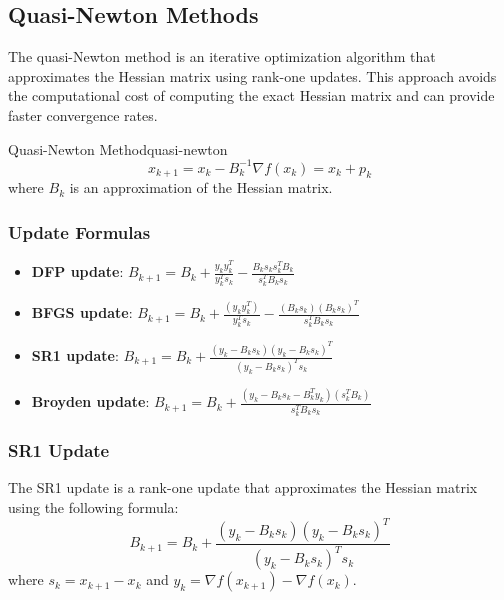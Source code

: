 \subsection*{Quasi-Newton Methods}
The quasi-Newton method is an iterative optimization algorithm that approximates the Hessian matrix using rank-one updates.
This approach avoids the computational cost of computing the exact Hessian matrix and can provide faster convergence rates.
\begin{definition}{Quasi-Newton Method}{quasi-newton}
	\[
		x_{k+1} = x_k - B_k^{-1} \nabla f(x_k) = x_k + p_k
	\]
	where \( B_k \) is an approximation of the Hessian matrix.
\end{definition}

\begin{algorithm}[H]
	\caption{Quasi-Newton Method}
	\label{alg:quasi-newton}
	\;
	\;
\end{algorithm}

\subsubsection*{Update Formulas}

\begin{itemize}
	\item \textbf{DFP update}: \( B_{k+1} = B_k + \frac{y_k y_k^T}{y_k^T s_k} - \frac{B_k s_k s_k^T B_k}{s_k^T B_k s_k} \)
	\item \textbf{BFGS update}: \( B_{k+1} = B_k + \frac{(y_k y_k^T)}{y_k^T s_k} - \frac{(B_k s_k)(B_k s_k)^T}{s_k^T B_k s_k} \)
	\item \textbf{SR1 update}: \( B_{k+1} = B_k + \frac{(y_k - B_k s_k)(y_k - B_k s_k)^T}{(y_k - B_k s_k)^T s_k} \)
	\item \textbf{Broyden update}: \( B_{k+1} = B_k + \frac{(y_k - B_k s_k - B_k^T y_k)(s_k^T B_k)}{s_k^T B_k s_k} \)
\end{itemize}

\subsubsection*{SR1 Update}
The SR1 update is a rank-one update that approximates the Hessian matrix using the following formula:
\[
	B_{k+1} = B_k + \frac{(y_k - B_k s_k)(y_k - B_k s_k)^T}{(y_k - B_k s_k)^T s_k}
\]
where \( s_k = x_{k+1} - x_k \) and \( y_k = \nabla f(x_{k+1}) - \nabla f(x_k) \).


